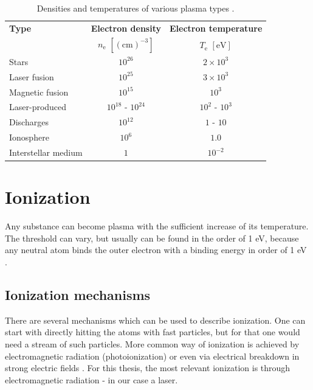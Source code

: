 \begin{table}[hb]
	\centering
	\begin{tabular}{lcc}
		\textbf{Type}		& \textbf{Electron density}			 			 	& \textbf{Electron temperature} \\ 
		& $n_\mathrm{e}$ $\left[\mathrm{(cm)}^{-3}\right]$  &  $T_\mathrm{e}$ $\left[\mathrm{eV}\right]$ \\ \hline
		Stars 				& $10^{26}$          	& $2 \times 10^3$       \\
		Laser fusion    	& $10^{25}$           	& $3 \times 10^3$       \\
		Magnetic fusion		& $10^{15}$ 			& $10^3$         		\\
		Laser-produced		& $10^{18}$ - $10^{24}$ & $10^2$ - $10^3$       \\
		Discharges			& $10^{12}$          	& $1$ - $10$         	\\
		Ionosphere		    & $10^6$            	& $1.0$         		\\
		Interstellar medium & $1$               	& $10^{-2}$         	\\ \hline
	\end{tabular}
	\caption{Densities and temperatures of various plasma types \cite{plasma-intro}.}
	
	\label{tab:den-temp}
\end{table}


\section{Ionization}
Any substance can become plasma with the sufficient increase of its temperature. The threshold can vary, but usually can be found in the order of 1 eV, because any neutral atom binds the outer electron with a binding energy in order of 1 eV \cite{laser-plasma1}. 

\subsection*{Ionization mechanisms}
There are several mechanisms which can be used to describe ionization. One can start with directly hitting the atoms with fast particles, but for that one would need a stream of such particles. More common way of ionization is achieved by electromagnetic radiation (photoionization) or even via electrical breakdown in strong electric fields \cite{plasma-intro}. For this thesis, the most relevant ionization is through electromagnetic radiation - in our case a laser.


